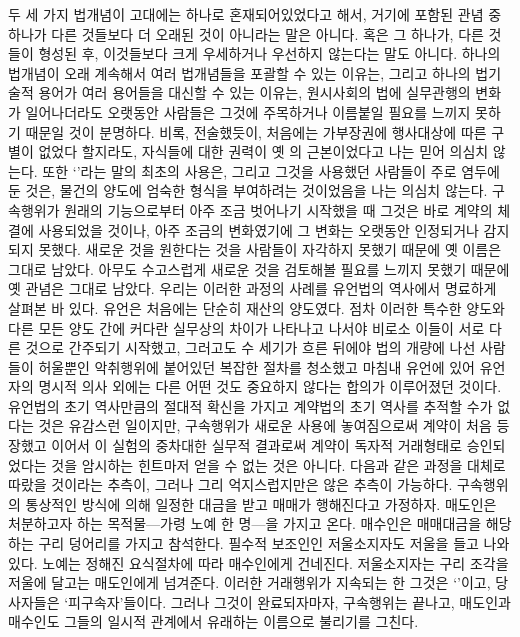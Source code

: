두 세 가지 법개념이 고대에는 하나로 혼재되어있었다고 해서,
거기에 포함된 관념 중 하나가 다른 것들보다 더 오래된 것이 아니라는
말은 아니다.
혹은 그 하나가, 다른 것들이 형성된 후,
이것들보다 크게 우세하거나 우선하지 않는다는 말도 아니다.
하나의 법개념이 오래 계속해서 여러 법개념들을 포괄할 수 있는 이유는,
그리고 하나의 법기술적 용어가 여러 용어들을 대신할 수 있는 이유는,
원시사회의 법에 실무관행의 변화가 일어나더라도
오랫동안 사람들은 그것에 주목하거나 이름붙일
필요를 느끼지 못하기 때문일 것이 분명하다.
비록, 전술했듯이,
처음에는 가부장권에 행사대상에 따른 구별이 없었다 할지라도,
자식들에 대한 권력이 옛 의 근본이었다고
나는 믿어 의심치 않는다.
또한
`'라는 말의 최초의 사용은,
그리고 그것을 사용했던 사람들이 주로 염두에 둔 것은,
물건의 양도에 엄숙한 형식을 부여하려는 것이었음을
나는 의심치 않는다.
구속행위가 원래의 기능으로부터 아주 조금 벗어나기 시작했을 때
그것은 바로 계약의 체결에 사용되었을 것이나,
아주 조금의 변화였기에 그 변화는 오랫동안 인정되거나 감지되지 못했다.
새로운 것을 원한다는 것을 사람들이 자각하지 못했기 때문에
옛 이름은 그대로 남았다.
아무도 수고스럽게 새로운 것을 검토해볼 필요를 느끼지 못했기 때문에
옛 관념은 그대로 남았다.
우리는 이러한 과정의 사례를 유언법의 역사에서 명료하게 살펴본 바 있다.
유언은 처음에는 단순히 재산의 양도였다.
점차 이러한 특수한 양도와 다른 모든 양도 간에 커다란 실무상의 차이가
나타나고 나서야 비로소
이들이
서로 다른 것으로 간주되기 시작했고,
그러고도 수 세기가 흐른 뒤에야
법의 개량에 나선 사람들이
허울뿐인 악취행위에 붙어있던 복잡한 절차를
청소했고 마침내
유언에 있어
유언자의 명시적 의사 외에는 다른 어떤 것도 중요하지 않다는
합의가 이루어졌던 것이다.
유언법의 초기 역사만큼의
절대적 확신을 가지고
계약법의 초기 역사를 추적할 수가 없다는 것은 유감스런 일이지만,
구속행위가 새로운 사용에 놓여짐으로써
계약이 처음 등장했고
이어서
이 실험의 중차대한 실무적 결과로써
계약이 독자적 거래형태로 승인되었다는 것을 암시하는
힌트마저 얻을 수 없는 것은 아니다.
다음과 같은 과정을 대체로 따랐을 것이라는 추측이,
그러나 그리 억지스럽지만은 않은 추측이 가능하다.
구속행위의 통상적인 방식에 의해
일정한 대금을 받고 매매가 행해진다고 가정하자.
매도인은 처분하고자 하는 목적물---가령 노예 한 명---을 가지고 온다.
매수인은 매매대금을 해당하는 구리 덩어리를 가지고 참석한다.
필수적 보조인인 저울소지자도 저울을 들고 나와있다.
노예는 정해진 요식절차에 따라 매수인에게 건네진다.
저울소지자는 구리 조각을 저울에 달고는 매도인에게 넘겨준다.
이러한 거래행위가 지속되는 한 그것은 `'이고,
당사자들은 `피구속자'들이다.
그러나 그것이 완료되자마자,
구속행위는 끝나고,
매도인과 매수인도 그들의 일시적 관계에서 유래하는 이름으로 불리기를 그친다.
